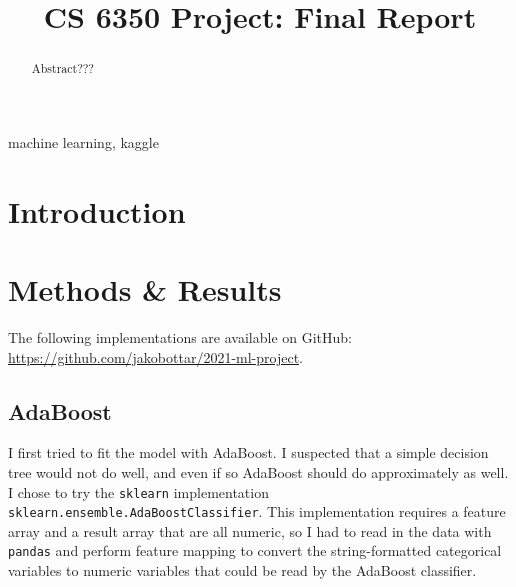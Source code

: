 \documentclass[conference]{IEEEtran}
\begin{document}
\title{CS 6350 Project: Final Report}

\author{
}

\maketitle

\begin{abstract}
Abstract???
\end{abstract}

\begin{IEEEkeywords}
machine learning, kaggle
\end{IEEEkeywords}

\section{Introduction}

\section{Methods \& Results}
The following implementations are available on GitHub: \href{https://github.com/jakobottar/2021-ml-project}{https://github.com/jakobottar/2021-ml-project}.
    \subsection{AdaBoost}
        I first tried to fit the model with AdaBoost. I suspected that a simple decision tree would not do well, and even if so AdaBoost should do approximately as well. I chose to try the \lstinline{sklearn} implementation \lstinline{sklearn.ensemble.AdaBoostClassifier}. This implementation requires a feature array and a result array that are all numeric, so I had to read in the data with \lstinline{pandas} and perform feature mapping to convert the string-formatted categorical variables to numeric variables that could be read by the AdaBoost classifier. 
\end{document}
